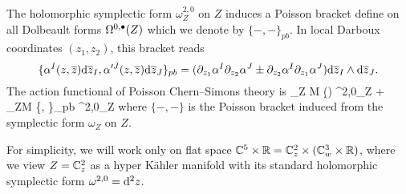 The holomorphic symplectic form $\omega_Z^{2,0}$ on $Z$ induces a Poisson bracket define on all Dolbeault forms $\Omega^{0,\bullet}(Z)$ which we denote by $\{-,-\}_{pb}$. 
In local Darboux coordinates $(z_1,z_2)$, this bracket reads
\[
\{\alpha^I (z,\overline{z}) {\rm d} \overline{z}_I , \alpha'^J (z,\overline{z}) {\rm d} \overline{z}_J\}_{pb} = (\partial_{z_1} \alpha^I \partial_{z_2} \alpha^J \pm \partial_{z_2} \alpha^I \partial_{z_1} \alpha^J) {\rm d} \overline{z}_I \wedge {\rm d} \overline{z}_J . 
\]
The action functional of Poisson Chern--Simons theory is 
\beqn\label{eqn:pcsaction}
     \int_{Z \times M} (\alpha \wedge \d\alpha) \wedge \omega^{2,0}_Z  +  \int_{Z\times M} \alpha \wedge \{\alpha, \alpha\}_{pb} \wedge \omega^{2,0}_Z
\eeqn
where $\{-,-\}$ is the Poisson bracket induced from the symplectic form $\omega_Z$ on $Z$. 

For simplicity, we will work only on flat space $\mathbb C^5 \times \mathbb R = \mathbb C^2_z \times (\mathbb C^3_w \times \mathbb R)$, where we view $Z = \mathbb C^2_z$ as a hyper K\"ahler manifold with its standard holomorphic symplectic form $\omega^{2,0} = {\rm d}^2 z$.

